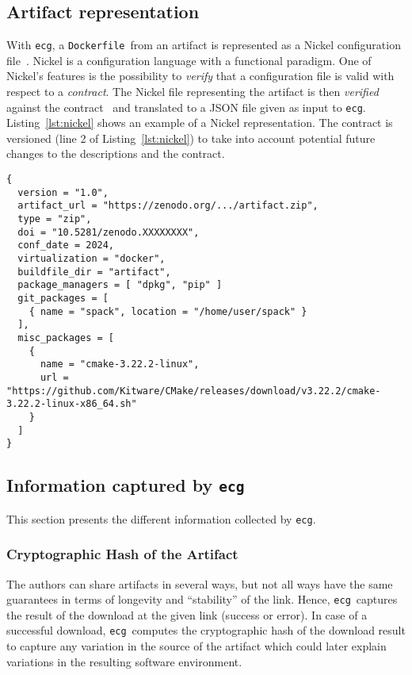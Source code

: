 \documentclass[sigconf,natbib=false]{acmart}
\newcommand{\df}{\texttt{Dockerfile}}
\newcommand{\ecg}{\texttt{ecg}}
\begin{document}
\subsection{Artifact representation}\label{sec:nickel}

With \ecg, a \df\ from an artifact is represented as a Nickel configuration file~\cite{nickel}.
Nickel is a configuration language with a functional paradigm.
One of Nickel's features is the possibility to \emph{verify} that a configuration file is valid with respect to a \emph{contract}.
The Nickel file representing the artifact is then \emph{verified} against the contract~\cite{ecg_contract} and translated to a JSON file given as input to \ecg.
Listing~\ref{lst:nickel} shows an example of a Nickel representation.
The contract is versioned (line 2 of Listing~\ref{lst:nickel}) to take into account potential future changes to the descriptions and the contract.

\begin{lstlisting}[caption=Example of Artifact representation in Nickel, label=lst:nickel]
{
  version = "1.0",
  artifact_url = "https://zenodo.org/.../artifact.zip",
  type = "zip",
  doi = "10.5281/zenodo.XXXXXXXX",
  conf_date = 2024,
  virtualization = "docker",
  buildfile_dir = "artifact",
  package_managers = [ "dpkg", "pip" ]
  git_packages = [
    { name = "spack", location = "/home/user/spack" }
  ],
  misc_packages = [
    {
      name = "cmake-3.22.2-linux",
      url = "https://github.com/Kitware/CMake/releases/download/v3.22.2/cmake-3.22.2-linux-x86_64.sh"
    }
  ]
}
\end{lstlisting}


\subsection{Information captured by \ecg}\label{sec:ecg:capture}

This section presents the different information collected by \ecg.%

\subsubsection{Cryptographic Hash of the Artifact}

The authors can share artifacts in several ways, but not all ways have the same guarantees in terms of longevity and ``stability'' of the link.
Hence, \ecg\ captures the result of the download at the given link (success or error).
In case of a successful download, \ecg\ computes the cryptographic hash of the download result to capture any variation in the source of the artifact which could later explain variations in the resulting software environment.
\end{document}
